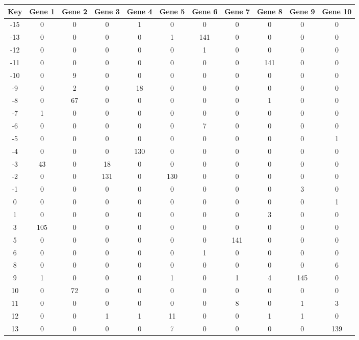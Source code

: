 \begin{tabular}{|c|c|c|c|c|c|c|c|c|c|c|}
\hline
Key & Gene 1 & Gene 2 & Gene 3 & Gene 4 & Gene 5 & Gene 6 & Gene 7 & Gene 8 & Gene 9 & Gene 10 \\
\hline
-15 & 0 & 0 & 0 & 1 & 0 & 0 & 0 & 0 & 0 & 0 \\
-13 & 0 & 0 & 0 & 0 & 1 & 141 & 0 & 0 & 0 & 0 \\
-12 & 0 & 0 & 0 & 0 & 0 & 1 & 0 & 0 & 0 & 0 \\
-11 & 0 & 0 & 0 & 0 & 0 & 0 & 0 & 141 & 0 & 0 \\
-10 & 0 & 9 & 0 & 0 & 0 & 0 & 0 & 0 & 0 & 0 \\
-9 & 0 & 2 & 0 & 18 & 0 & 0 & 0 & 0 & 0 & 0 \\
-8 & 0 & 67 & 0 & 0 & 0 & 0 & 0 & 1 & 0 & 0 \\
-7 & 1 & 0 & 0 & 0 & 0 & 0 & 0 & 0 & 0 & 0 \\
-6 & 0 & 0 & 0 & 0 & 0 & 7 & 0 & 0 & 0 & 0 \\
-5 & 0 & 0 & 0 & 0 & 0 & 0 & 0 & 0 & 0 & 1 \\
-4 & 0 & 0 & 0 & 130 & 0 & 0 & 0 & 0 & 0 & 0 \\
-3 & 43 & 0 & 18 & 0 & 0 & 0 & 0 & 0 & 0 & 0 \\
-2 & 0 & 0 & 131 & 0 & 130 & 0 & 0 & 0 & 0 & 0 \\
-1 & 0 & 0 & 0 & 0 & 0 & 0 & 0 & 0 & 3 & 0 \\
0 & 0 & 0 & 0 & 0 & 0 & 0 & 0 & 0 & 0 & 1 \\
1 & 0 & 0 & 0 & 0 & 0 & 0 & 0 & 3 & 0 & 0 \\
3 & 105 & 0 & 0 & 0 & 0 & 0 & 0 & 0 & 0 & 0 \\
5 & 0 & 0 & 0 & 0 & 0 & 0 & 141 & 0 & 0 & 0 \\
6 & 0 & 0 & 0 & 0 & 0 & 1 & 0 & 0 & 0 & 0 \\
8 & 0 & 0 & 0 & 0 & 0 & 0 & 0 & 0 & 0 & 6 \\
9 & 1 & 0 & 0 & 0 & 1 & 0 & 1 & 4 & 145 & 0 \\
10 & 0 & 72 & 0 & 0 & 0 & 0 & 0 & 0 & 0 & 0 \\
11 & 0 & 0 & 0 & 0 & 0 & 0 & 8 & 0 & 1 & 3 \\
12 & 0 & 0 & 1 & 1 & 11 & 0 & 0 & 1 & 1 & 0 \\
13 & 0 & 0 & 0 & 0 & 7 & 0 & 0 & 0 & 0 & 139 \\
\hline
\end{tabular}